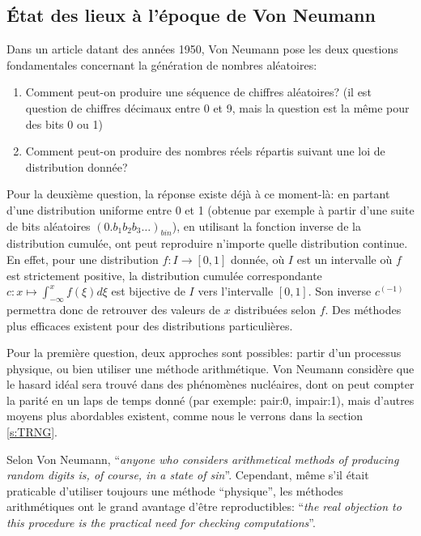 \documentclass{scrartcl}
\begin{document}
\subsection{État des lieux à l'époque de Von Neumann}\label{ss:vonneumann}
Dans un article datant des années 1950, Von Neumann\cite{VonNeumann} pose les
deux questions fondamentales concernant la génération de nombres aléatoires:
\begin{enumerate}
\item Comment peut-on produire une séquence de chiffres aléatoires? (il est
  question de chiffres décimaux entre 0 et 9, mais la question est la même pour
  des bits 0 ou 1)
\item Comment peut-on produire des nombres réels répartis suivant une loi de
  distribution donnée?
\end{enumerate}
Pour la deuxième question, la réponse existe déjà à ce moment-là: en partant
d'une distribution uniforme entre 0 et 1 (obtenue par exemple à partir d'une
suite de bits aléatoires $(0.b_1b_2b_3\ldots)_{bin}$), en utilisant la fonction
inverse de la distribution cumulée, ont peut reproduire n'importe quelle
distribution continue. En effet, pour une distribution $f:I\rightarrow[0,1]$
donnée, où $I$ est un intervalle où $f$ est strictement positive, la
distribution cumulée correspondante $c:x\mapsto\int_{-\infty}^xf(\xi)d\xi$ est
bijective de $I$ vers l'intervalle $[0,1]$. Son inverse $c^{(-1)}$ permettra
donc de retrouver des valeurs de $x$ distribuées selon $f$. Des méthodes plus
efficaces existent pour des distributions particulières.\par\medskip

Pour la première question, deux approches sont possibles: partir d'un processus
physique, ou bien utiliser une méthode arithmétique. Von Neumann considère que
le hasard idéal sera trouvé dans des phénomènes nucléaires, dont on peut compter
la parité en un laps de temps donné (par exemple: pair:0, impair:1), mais
d'autres moyens plus abordables existent, comme nous le verrons dans la section
\ref{s:TRNG}.

Selon Von Neumann, ``\textit{anyone who considers arithmetical methods of
  producing random digits is, of course, in a state of sin}''.  Cependant, même
s'il était praticable d'utiliser toujours une méthode ``physique'', les méthodes
arithmétiques ont le grand avantage d'être reproductibles: ``\textit{the real
  objection to this procedure is the practical need for checking
  computations}''.
\par\medskip
\end{document}
